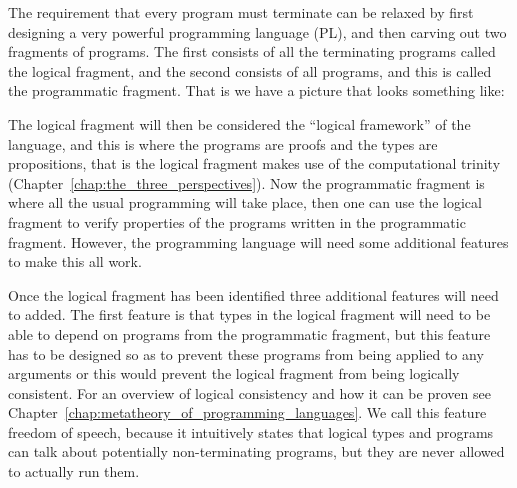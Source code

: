 

\renewcommand{\FSdrulename}[1]{\scriptsize \textsc{#1}}

\newcommand{\tvdash}[1]{\vdash^{#1}}
\newcommand{\arrowT}[5]{(#1 :^{#2} #3)^{#4} \to #5}
\newcommand{\rec}[3]{rec\ #1\ #2\ #3}
\newcommand{\recc}[3]{rec^{-}\ #1\ #3}

The requirement that every program must terminate can be relaxed by
first designing a very powerful programming language (PL), and then
carving out two fragments of programs. The first consists of all the
terminating programs called the logical fragment, and the second
consists of all programs, and this is called the programmatic
fragment. That is we have a picture that looks something like:
\begin{center}
\end{center}
The logical fragment will then be considered the ``logical framework''
of the language, and this is where the programs are proofs and the
types are propositions, that is the logical fragment makes use of the
computational trinity (Chapter~\ref{chap:the_three_perspectives}).
Now the programmatic fragment is where all the usual programming will
take place, then one can use the logical fragment to verify properties
of the programs written in the programmatic fragment.  However, the
programming language will need some additional features to make this
all work.

Once the logical fragment has been identified three additional
features will need to added.  The first feature is that types in the
logical fragment will need to be able to depend on programs from the
programmatic fragment, but this feature has to be designed so as to
prevent these programs from being applied to any arguments or this
would prevent the logical fragment from being logically consistent.
For an overview of logical consistency and how it can be proven see
Chapter~\ref{chap:metatheory_of_programming_languages}.  We call this
feature freedom of speech, because it intuitively states that logical
types and programs can talk about potentially non-terminating
programs, but they are never allowed to actually run them.

